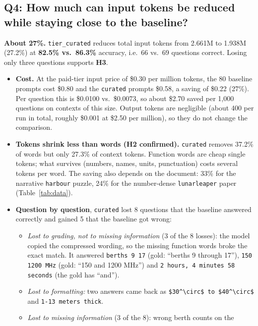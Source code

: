 \documentclass[11pt]{article}
\newcommand{\code}[1]{\texttt{#1}}
\begin{document}
\subsection{Q4: How much can input tokens be reduced while staying close to the baseline?}
\textbf{About 27\%.} \code{tier\_curated} reduces total input tokens from 2.661M to 1.938M (27.2\%)
at \textbf{82.5\% vs.\ 86.3\%} accuracy, i.e.\ 66 vs.\ 69 questions correct. Losing only three questions supports
\textbf{H3}.
\begin{itemize}
  \item \textbf{Cost.} At the paid-tier input price of \$0.30 per million tokens, the 80 baseline
        prompts cost \$0.80 and the \code{curated} prompts \$0.58, a saving of \$0.22 (27\%). Per
        question this is \$0.0100 vs.\ \$0.0073, so about \$2.70 saved per 1{,}000 questions on
        contexts of this size. Output tokens are negligible (about 400 per run in total, roughly \$0.001 at
        \$2.50 per million), so they do not change the comparison.
  \item \textbf{Tokens shrink less than words (H2 confirmed).} \code{curated} removes 37.2\% of
        words but only 27.3\% of context tokens. Function words are cheap single tokens; what
        survives (numbers, names, units, punctuation) costs several tokens per word. The saving also
        depends on the document: 33\% for the narrative \code{harbour} puzzle, 24\% for the
        number-dense \code{lunarleaper} paper (Table~\ref{tab:data}).
  \item \textbf{Question by question}, \code{curated} lost 8 questions that the baseline answered
        correctly and gained 5 that the baseline got wrong:
        \begin{itemize}
          \item \emph{Lost to grading, not to missing information} (3 of the 8 losses): the
                model copied the compressed wording, so the missing function words broke the exact
                match. It answered \code{berths 9 17} (gold: ``berths 9 through 17''),
                \code{150 1200 MHz} (gold: ``150 and 1200 MHz'') and
                \code{2 hours, 4 minutes 58 seconds} (the gold has ``and'').
          \item \emph{Lost to formatting:} two answers came back as \verb|$30^\circ$ to $40^\circ$|
                and \code{1-13 meters thick}.
          \item \emph{Lost to missing information} (3 of the 8): wrong berth counts on the

\end{itemize}
\end{itemize}
\end{document}
